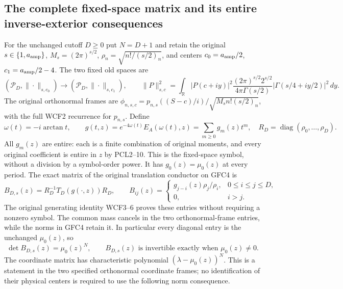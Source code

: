 \subsection{The complete fixed-space matrix and its entire inverse-exterior consequences}
For the unchanged cutoff $D\ge0$ put $N=D+1$ and retain the original
$s\in\{1,a_{\rm amp}\}$, $M_s=(2\pi)^{s/2}$,
$\rho_n=\sqrt{n!/(s/2)_n}$, and centers
$c_0=a_{\rm amp}/2$, $c_1=a_{\rm amp}/2-4$.
The two fixed old spaces are
\[
 (\mathcal P_D,\|\cdot\|_{s,c_0})
       \longrightarrow(\mathcal P_D,\|\cdot\|_{s,c_1}),\qquad
 \|P\|_{s,c}^2=\int_{\mathbb R}|P(c+iy)|^2
 \frac{(2\pi)^{s/2}2^{s/2}}{4\pi\Gamma(s/2)}
       |\Gamma(s/4+iy/2)|^2\,dy.
 \tag{GFC4}
\]
The original orthonormal frames are
$\phi_{n,s,c}=p_{n,s}((S-c)/i)/\sqrt{M_sn!(s/2)_n}$,
with the full WCF2 recurrence for $p_{n,s}$.
Define
\[
 \omega(t)=-i\arctan t,\qquad
 g(t,z)=e^{-4\omega(t)}E_A(\omega(t),z)
       =\sum_{m\ge0}g_m(z)t^m,
 \quad
 R_D=\operatorname{diag}(\rho_0,\ldots,\rho_D).
 \tag{GFC5}
\]
All $g_m(z)$ are entire: each is a finite combination of original
moments, and every original coefficient is entire in $z$ by PCL2--10.
This is the fixed-space symbol, without a division by a symbol-order
power. It has $g_0(z)=\mu_0(z)$ at every period.
The exact matrix of the original translation conductor on GFC4 is
\[
 B_{D,s}(z)=R_D^{-1}T_D(g(\cdot,z))R_D,
 \qquad
 B_{ij}(z)=
 \begin{cases}
 g_{j-i}(z)\rho_j/\rho_i,&0\le i\le j\le D,\\
 0,&i>j.
 \end{cases}
 \tag{GFC6}
\]
The original generating identity WCF3--6 proves these entries without
requiring a nonzero symbol. The common mass cancels in the two
orthonormal-frame entries, while the norms in GFC4 retain it.
In particular every diagonal entry is the unchanged $\mu_0(z)$, so
\[
 \det B_{D,s}(z)=\mu_0(z)^N,\qquad
 B_{D,s}(z)\text{ is invertible exactly when }\mu_0(z)\ne0.
 \tag{GFC7}
\]
The coordinate matrix has characteristic polynomial
$(\lambda-\mu_0(z))^N$. This is a statement in the two specified
orthonormal coordinate frames; no identification of their physical
centers is required to use the following norm consequence.

